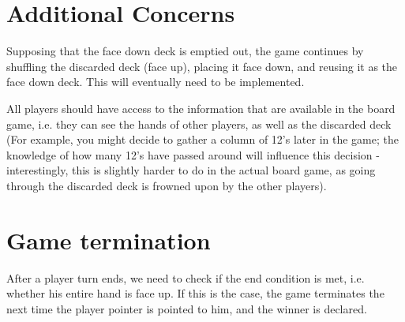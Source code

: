 \documentclass[11pt]{article}
\begin{document}
\section{Additional Concerns}

Supposing that the face down deck is emptied out, the game continues by 
shuffling the discarded deck (face up), placing it face down, 
and reusing it as the face down deck. This will eventually need to be implemented.

All players should have access to the information that are available in the board game, 
i.e. they can see the hands of other players, as well as the discarded deck (For example,
you might decide to gather a column of 12's later in the game; 
the knowledge of how many 12's have passed around will influence this decision - interestingly,
this is slightly harder to do in the actual board game, as going through the discarded deck
is frowned upon by the other players).


\section{Game termination}

After a player turn ends, we need to check if the end condition is met, i.e. whether 
his entire hand is face up. If this is the case, the game terminates the next time the 
player pointer is pointed to him, and the winner is declared.
 
\end{document}
